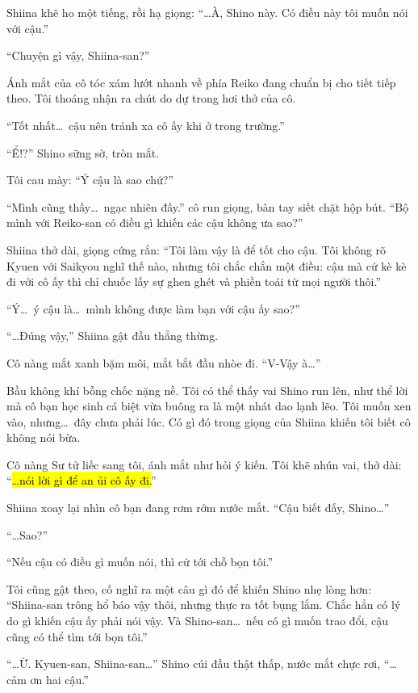\documentclass[../main.tex]{subfiles}
\begin{document}
Shiina khẽ ho một tiếng, rồi hạ giọng: ``\dots À, Shino này. Có điều này tôi muốn nói với cậu.''

``Chuyện gì vậy, Shiina-san?''

Ánh mắt của cô tóc xám lướt nhanh về phía Reiko đang chuẩn bị cho tiết tiếp theo. Tôi thoáng nhận ra chút do dự trong hơi thở của cô.

``Tốt nhất\dots\ cậu nên tránh xa cô ấy khi ở trong trường.''

``Ể!?'' Shino sững sờ, tròn mắt.

Tôi cau mày: ``Ý cậu là sao chứ?''

``Mình cũng thấy\dots\ ngạc nhiên đấy.'' cô run giọng, bàn tay siết chặt hộp bút. ``Bộ mình với Reiko-san có điều gì khiến các cậu không ưa sao?''

Shiina thở dài, giọng cứng rắn: ``Tôi làm vậy là để tốt cho cậu. Tôi không rõ Kyuen với Saikyou nghĩ thế nào, nhưng tôi chắc chắn một điều: cậu mà cứ kè kè đi với cô ấy thì chỉ chuốc lấy sự ghen ghét và phiền toái từ mọi người thôi.''

``Ý\dots\ ý cậu là\dots\ mình không được làm bạn với cậu ấy sao?''

``\dots Đúng vậy,'' Shiina gật đầu thẳng thừng.

Cô nàng mắt xanh bặm môi, mắt bắt đầu nhòe đi. ``V-Vậy à\dots''

Bầu không khí bỗng chốc nặng nề. Tôi có thể thấy vai Shino run lên, như thể lời mà cô bạn học sinh cá biệt vừa buông ra là một nhát dao lạnh lẽo. Tôi muốn xen vào, nhưng\dots\ đây chưa phải lúc. Có gì đó trong giọng của Shiina khiến tôi biết cô không nói bừa.

Cô nàng Sư tử liếc sang tôi, ánh mắt như hỏi ý kiến. Tôi khẽ nhún vai, thở dài: ``\hl{\dots nói lời gì để an ủi cô ấy đi.}''

Shiina xoay lại nhìn cô bạn đang rơm rớm nước mắt. ``Cậu biết đấy, Shino\dots''

``\dots Sao?''

``Nếu cậu có điều gì muốn nói, thì cứ tới chỗ bọn tôi.''

Tôi cũng gật theo, cố nghĩ ra một câu gì đó để khiến Shino nhẹ lòng hơn: ``Shiina-san trông hổ báo vậy thôi, nhưng thực ra tốt bụng lắm. Chắc hẳn có lý do gì khiến cậu ấy phải nói vậy. Và Shino-san\dots\ nếu có gì muốn trao đổi, cậu cũng có thể tìm tới bọn tôi.''

``\dots Ừ. Kyuen-san, Shiina-san\dots'' Shino cúi đầu thật thấp, nước mắt chực rơi, ``\dots cảm ơn hai cậu.''
\end{document}
